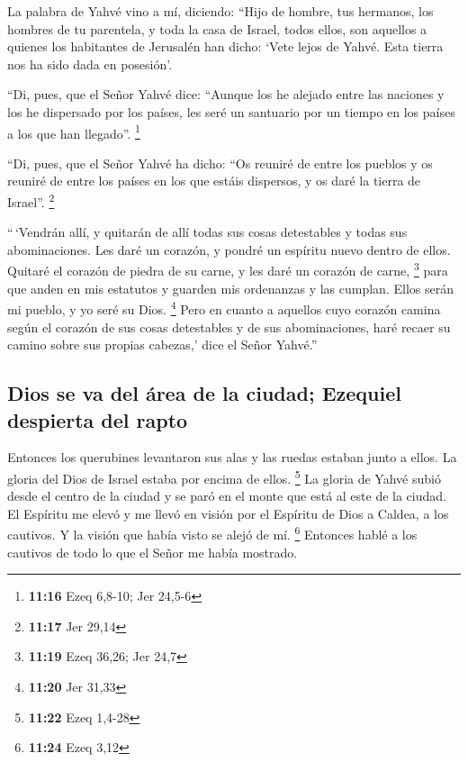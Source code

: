  La palabra de Yahvé vino a mí, diciendo: 
``Hijo de hombre, tus hermanos, los hombres de tu parentela, y toda la
casa de Israel, todos ellos, son aquellos a quienes los habitantes de
Jerusalén han dicho: `Vete lejos de Yahvé. Esta tierra nos ha sido dada
en posesión'.

 ``Di, pues, que el Señor Yahvé dice: ``Aunque los he
alejado entre las naciones y los he dispersado por los países, les seré
un santuario por un tiempo en los países a los que han llegado''.
\footnote{\textbf{11:16} Ezeq 6,8-10; Jer 24,5-6}

 ``Di, pues, que el Señor Yahvé ha dicho: ``Os reuniré de
entre los pueblos y os reuniré de entre los países en los que estáis
dispersos, y os daré la tierra de Israel''. \footnote{\textbf{11:17} Jer
  29,14}

 ``\,`Vendrán allí, y quitarán de allí todas sus cosas
detestables y todas sus abominaciones.  Les daré un
corazón, y pondré un espíritu nuevo dentro de ellos. Quitaré el corazón
de piedra de su carne, y les daré un corazón de carne, \footnote{\textbf{11:19}
  Ezeq 36,26; Jer 24,7}  para que anden en mis estatutos
y guarden mis ordenanzas y las cumplan. Ellos serán mi pueblo, y yo seré
su Dios. \footnote{\textbf{11:20} Jer 31,33}  Pero en
cuanto a aquellos cuyo corazón camina según el corazón de sus cosas
detestables y de sus abominaciones, haré recaer su camino sobre sus
propias cabezas,' dice el Señor Yahvé.''

\hypertarget{dios-se-va-del-uxe1rea-de-la-ciudad-ezequiel-despierta-del-rapto}{%
\subsection{Dios se va del área de la ciudad; Ezequiel despierta del
rapto}\label{dios-se-va-del-uxe1rea-de-la-ciudad-ezequiel-despierta-del-rapto}}

 Entonces los querubines levantaron sus alas y las ruedas
estaban junto a ellos. La gloria del Dios de Israel estaba por encima de
ellos. \footnote{\textbf{11:22} Ezeq 1,4-28}  La gloria
de Yahvé subió desde el centro de la ciudad y se paró en el monte que
está al este de la ciudad.  El Espíritu me elevó y me
llevó en visión por el Espíritu de Dios a Caldea, a los cautivos. Y la
visión que había visto se alejó de mí. \footnote{\textbf{11:24} Ezeq
  3,12}  Entonces hablé a los cautivos de todo lo que el
Señor me había mostrado.

